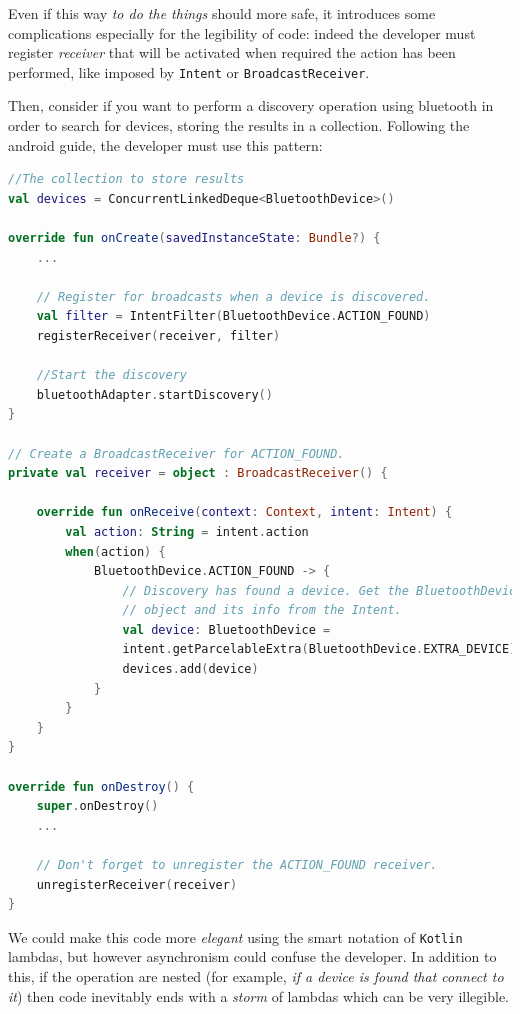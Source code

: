 Even if this way \textit{to do the things} should more safe, it introduces some complications especially for the legibility of code: indeed the developer must register \textit{receiver} that will be activated when required the action has been performed, like imposed by \texttt{Intent} or \texttt{BroadcastReceiver}.

Then, consider if you want to perform a discovery operation using bluetooth in order to search for devices, storing the results in a collection. Following the android guide, the developer must use this pattern:

\begin{lstlisting}[language=Kotlin]
//The collection to store results
val devices = ConcurrentLinkedDeque<BluetoothDevice>()
	
override fun onCreate(savedInstanceState: Bundle?) {
	...
	
	// Register for broadcasts when a device is discovered.
	val filter = IntentFilter(BluetoothDevice.ACTION_FOUND)
	registerReceiver(receiver, filter)
	
	//Start the discovery
	bluetoothAdapter.startDiscovery()
}

// Create a BroadcastReceiver for ACTION_FOUND.
private val receiver = object : BroadcastReceiver() {
	
	override fun onReceive(context: Context, intent: Intent) {
		val action: String = intent.action
		when(action) {
			BluetoothDevice.ACTION_FOUND -> {
				// Discovery has found a device. Get the BluetoothDevice
				// object and its info from the Intent.
				val device: BluetoothDevice =
				intent.getParcelableExtra(BluetoothDevice.EXTRA_DEVICE)
				devices.add(device)
			}
		}
	}
}

override fun onDestroy() {
	super.onDestroy()
	...
	
	// Don't forget to unregister the ACTION_FOUND receiver.
	unregisterReceiver(receiver)
}
\end{lstlisting}

We could make this code more \textit{elegant} using the smart notation of \texttt{Kotlin} lambdas, but however asynchronism could confuse the developer. In addition to this, if the operation are nested (for example, \textit{if a device is found that connect to it}) then code inevitably ends with a \textit{storm} of lambdas which can be very illegible.

